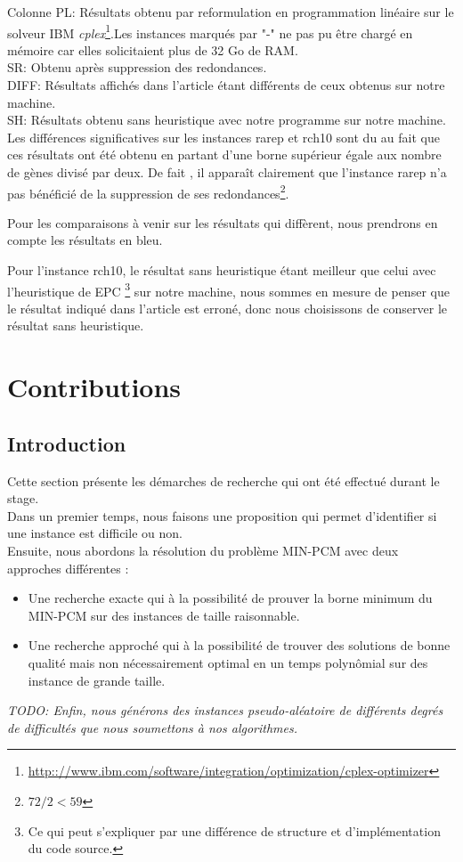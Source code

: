 \documentclass[a4paper,10pt]{article}
\begin{document}
Colonne PL: Résultats obtenu par reformulation en programmation linéaire sur le solveur IBM \textit{cplex}\footnote{\url{http:://www.ibm.com/software/integration/optimization/cplex-optimizer}}.Les instances marqués par "-" ne pas pu être chargé en mémoire car elles solicitaient plus de 32 Go de RAM.\\
SR: Obtenu après suppression des redondances.\\
DIFF: Résultats affichés dans l'article étant différents de ceux obtenus sur notre machine.\\
SH: Résultats obtenu sans heuristique avec notre programme sur notre machine.\\


Les différences significatives sur les instances rarep et rch10 sont du au fait que ces résultats ont été obtenu en partant d'une borne supérieur égale aux nombre de gènes divisé par deux. De fait , il apparaît clairement que l'instance rarep n'a pas bénéficié de la suppression de ses redondances\footnote{$72/2<59$}.

Pour les comparaisons à venir sur les résultats qui diffèrent, nous prendrons en compte les résultats en bleu.

Pour l'instance rch10, le résultat sans heuristique étant meilleur que celui avec l'heuristique de EPC \footnote{Ce qui peut s'expliquer par une différence de structure et d'implémentation du code source.} sur notre machine, nous sommes en mesure de penser que le résultat indiqué dans l'article est erroné, donc nous choisissons de conserver le résultat sans heuristique.



\section{Contributions}

\subsection{Introduction} 
Cette section présente les démarches de recherche qui ont été effectué durant le stage.\\
Dans un premier temps, nous faisons une proposition qui permet d'identifier si une instance est difficile ou non.\\
Ensuite, nous abordons la résolution du problème MIN-PCM avec deux approches différentes :
\begin{itemize}
\item Une recherche exacte qui à la possibilité de prouver la borne minimum du MIN-PCM sur des instances de taille raisonnable.
\item Une recherche approché qui à la possibilité de trouver des solutions de bonne qualité mais non nécessairement optimal en un temps polynômial sur des instance de grande taille.
\end{itemize} 
\textit{TODO: Enfin, nous générons des instances pseudo-aléatoire de différents degrés de difficultés que nous soumettons à nos algorithmes.}
\end{document}
